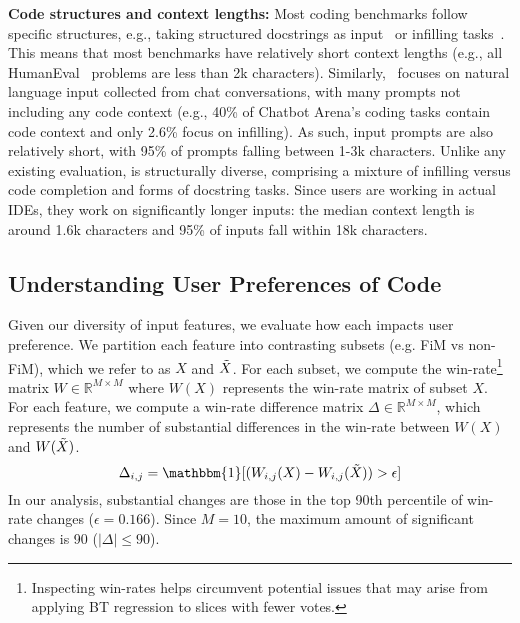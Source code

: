 \textbf{Code structures and context lengths:}
Most coding benchmarks follow specific structures, e.g., taking structured docstrings as input~\cite{chen2021evaluating, zhuo2024bigcodebenchbenchmarkingcodegeneration,jain2024livecodebench, white2024livebench} or infilling tasks~\cite{bavarian2022efficient, gong2024evaluation}.
This means that most benchmarks have relatively short context lengths (e.g., all HumanEval~\citep{chen2021evaluating} problems are less than 2k characters).
Similarly,~\citet{chiang2024chatbot} focuses on natural language input collected from chat conversations, with many prompts not including any code context (e.g., 40\% of Chatbot Arena's coding tasks contain code context and only 2.6\% focus on infilling).
As such, input prompts are also relatively short, with 95\% of prompts falling between 1-3k characters.
Unlike any existing evaluation, \systemName is structurally diverse, comprising a mixture of infilling versus code completion and forms of docstring tasks.
Since users are working in actual IDEs, they work on significantly longer inputs: the median context length is around 1.6k characters and 95\% of inputs fall within 18k characters.








\subsection{Understanding User Preferences of Code} \label{sec:analysis}

Given our diversity of input features,  we evaluate how each impacts user preference.
We partition each feature into contrasting subsets (e.g. FiM vs non-FiM), which we refer to as $X$ and $\Tilde{X}$.
For each subset, we compute the win-rate\footnote{Inspecting win-rates helps circumvent potential issues that may arise from applying BT regression to slices with fewer votes.} matrix $W \in \mathbb{R}^{M \times M}$ where $W(X)$ represents the win-rate matrix of subset $X$.
For each feature, we compute a win-rate difference matrix $\Delta \in \mathbb{R}^{M \times M}$, which represents the number of substantial differences in the win-rate between $W(X)$ and $W(\Tilde{X})$. 
\begin{equation*}
    \Delta_{i,j} = \mathbbm{1}[(W_{i,j}(X) - W_{i,j}(\Tilde{X})) > \epsilon]
\end{equation*}
In our analysis, substantial changes are those in the top 90th percentile of win-rate changes ($\epsilon = 0.166$).
Since $M=10$, the maximum amount of significant changes is 90 ($|\Delta| \leq 90$).

